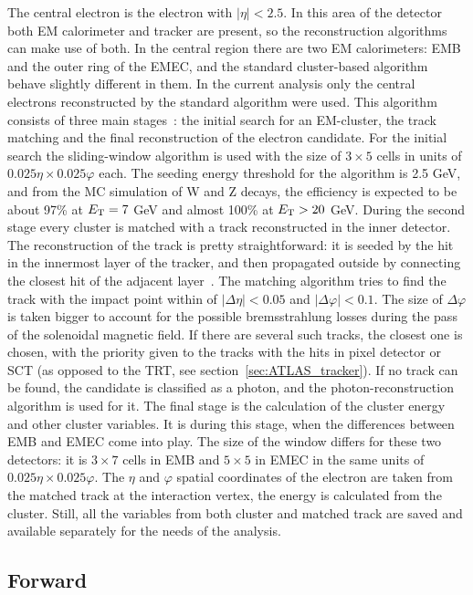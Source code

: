 The central electron is the electron with $|\eta| < 2.5$. In this area of the detector both EM calorimeter and tracker are present, so the reconstruction algorithms can make use of both. In the central region there are two  EM calorimeters: EMB and the outer ring of the EMEC, and the standard cluster-based algorithm behave slightly different in them. In the current analysis only the central electrons reconstructed by the standard algorithm were used. This algorithm consists of three main stages~\cite{lib:elec_reco}: the initial search for an EM-cluster, the track matching and the final reconstruction of the electron candidate. For the initial search the sliding-window algorithm is used with the size of $3 \times 5$ cells in units of $0.025 \eta \times 0.025 \varphi$ each. The seeding energy threshold for the algorithm is 2.5 GeV, and from the MC simulation of W and Z decays, the efficiency is expected to be about 97\% at $E_{\mathrm{T}} = 7$ GeV and almost 100\% at $E_{\mathrm{T}} > 20$ GeV. During the second stage every cluster is matched with a track reconstructed in the inner detector. The reconstruction of the track is pretty straightforward: it is seeded by the hit in the innermost layer of the tracker, and then propagated outside by connecting the closest hit of the adjacent layer~\cite{lib:track_reco}. The matching algorithm tries to find the track with the impact point within of $|\Delta\eta| < 0.05$ and $|\Delta\varphi| < 0.1$. The size of $\Delta\varphi$ is taken bigger to account for the possible bremsstrahlung losses during the pass of the solenoidal magnetic field. If there are several such tracks, the closest one is chosen, with the priority given to the tracks with the hits in pixel detector or SCT (as opposed to the TRT, see section~\ref{sec:ATLAS_tracker}). If no track can be found, the candidate is classified as a photon, and the photon-reconstruction algorithm is used for it. The final stage is the calculation of the cluster energy and other cluster variables. It is during this stage, when the differences between EMB and EMEC come into play. The size of the window differs for these two detectors: it is $3 \times 7$ cells in EMB and $5 \times 5$ in EMEC in the same units of $0.025 \eta \times 0.025 \varphi$. The $\eta$ and $\varphi$ spatial coordinates of the electron are taken from the matched track at the interaction vertex, the energy is calculated from the cluster. Still, all the variables from both cluster and matched track are saved and available separately for the needs of the analysis.

\subsection{Forward}


